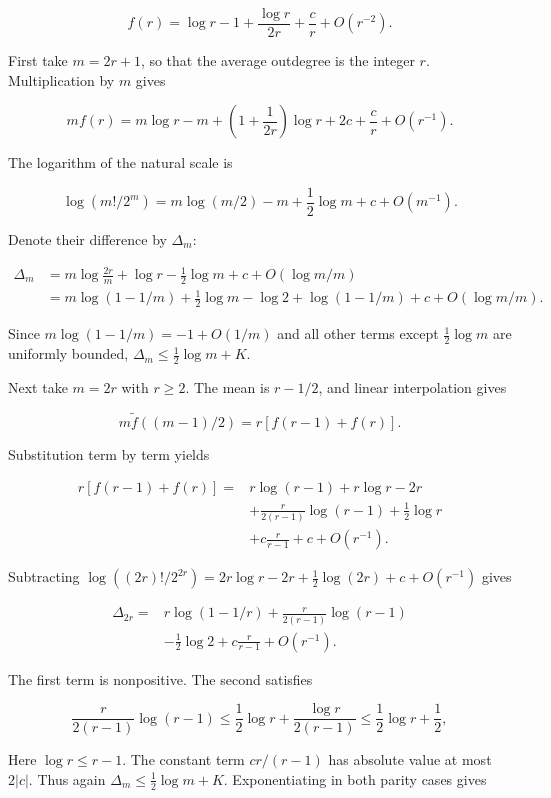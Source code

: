 \documentclass[11pt,a4paper]{article}
\begin{document}
\[
f(r)=\log r-1+\frac{\log r}{2r}+\frac cr+O(r^{-2}).
\]

First take \(m=2r+1\), so that the average outdegree is the integer \(r\). Multiplication by \(m\) gives

\[
mf(r)=m\log r-m+\left(1+\frac1{2r}\right)\log r
+2c+\frac cr+O(r^{-1}).
\]

The logarithm of the natural scale is

\[
\log(m!/2^m)=m\log(m/2)-m+\frac12\log m+c+O(m^{-1}).
\]

Denote their difference by \(\Delta_m\):

\[
\begin{aligned}
\Delta_m
&=m\log\frac{2r}{m}+\log r-\frac12\log m
+c+O(\log m/m)\\
&=m\log(1-1/m)+\frac12\log m-\log2
+\log(1-1/m)+c+O(\log m/m).
\end{aligned}
\]

Since \(m\log(1-1/m)=-1+O(1/m)\) and all other terms except \(\frac12\log m\) are uniformly bounded, \(\Delta_m\le\frac12\log m+K\).

Next take \(m=2r\) with \(r\ge2\). The mean is \(r-1/2\), and linear interpolation gives

\[
m\widetilde f((m-1)/2)=r[f(r-1)+f(r)].
\]

Substitution term by term yields

\[
\begin{aligned}
r[f(r-1)+f(r)]
={}&r\log(r-1)+r\log r-2r\\
&+\frac r{2(r-1)}\log(r-1)+\frac12\log r\\
&+c\frac r{r-1}+c+O(r^{-1}).
\end{aligned}
\]

Subtracting \(\log((2r)!/2^{2r})=2r\log r-2r+\frac12\log(2r)+c+O(r^{-1})\) gives

\[
\begin{aligned}
\Delta_{2r}
={}&r\log(1-1/r)
+\frac r{2(r-1)}\log(r-1)\\
&-\frac12\log2+c\frac r{r-1}+O(r^{-1}).
\end{aligned}
\]

The first term is nonpositive. The second satisfies

\[
\frac r{2(r-1)}\log(r-1)
\le\frac12\log r+\frac{\log r}{2(r-1)}
\le\frac12\log r+\frac12,
\]

Here \(\log r\le r-1\). The constant term \(c r/(r-1)\) has absolute value at most \(2|c|\). Thus again \(\Delta_m\le\frac12\log m+K\). Exponentiating in both parity cases gives
\end{document}

